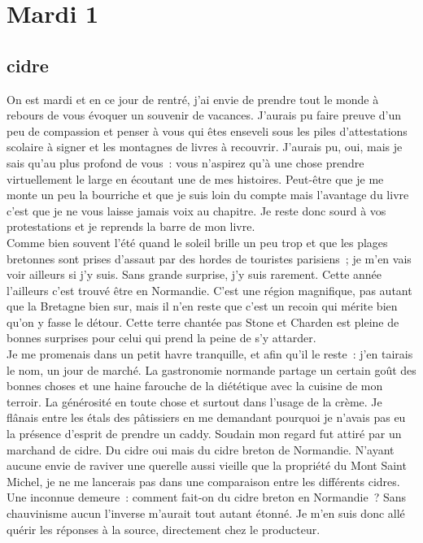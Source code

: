 ﻿\section*{Mardi 1}
\subsection{cidre}

On est mardi et en ce jour de rentré, j’ai envie de prendre tout le monde à rebours de vous évoquer un souvenir de vacances. J’aurais pu faire preuve d’un peu de compassion et penser à vous qui êtes enseveli sous les piles d’attestations scolaire à signer et les montagnes de livres à recouvrir. J’aurais pu, oui, mais je sais qu’au plus profond de vous : vous n’aspirez qu’à une chose prendre virtuellement le large en écoutant une de mes histoires.
Peut-être que je me monte un peu la bourriche et que je suis loin du compte mais l’avantage du livre c’est que je ne vous laisse jamais voix au chapitre. Je reste donc sourd à vos protestations et je reprends la barre de mon livre. \\

Comme bien souvent l’été quand le soleil brille un peu trop et que les plages bretonnes sont prises d’assaut par des hordes de touristes parisiens ; je m’en vais voir ailleurs si j’y suis. Sans grande surprise, j’y suis rarement. Cette année l’ailleurs c’est trouvé être en Normandie. C’est une région magnifique, pas autant que la Bretagne bien sur, mais il n’en reste que c’est un recoin qui mérite bien qu’on y fasse le détour. Cette terre chantée pas Stone et Charden est pleine de bonnes surprises pour celui qui prend la peine de s’y attarder.\\

Je me promenais dans un petit havre tranquille, et afin qu’il le reste : j’en tairais le nom, un jour de marché. La gastronomie normande partage un certain goût des bonnes choses et une haine farouche de la diététique avec la cuisine de mon terroir. La générosité en toute chose et surtout dans l’usage de la crème. Je flânais entre les étals des pâtissiers en me demandant pourquoi je n’avais pas eu la présence d’esprit de prendre un caddy. Soudain mon regard fut attiré par un marchand de cidre. Du cidre oui mais du cidre breton de Normandie. N’ayant aucune envie de raviver une querelle aussi vieille que la propriété du Mont Saint Michel, je ne me lancerais pas dans une comparaison entre les différents cidres. Une inconnue demeure : comment fait-on du cidre breton en Normandie ? Sans chauvinisme aucun l’inverse m’aurait tout autant étonné. 
Je m’en suis donc allé quérir les réponses à la source, directement chez le producteur.\\

